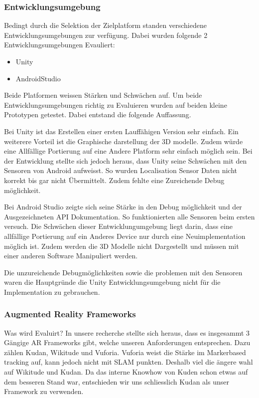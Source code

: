 \documentclass[a4paper]{scrreprt}
\begin{document}
\subsubsection{Entwicklungsumgebung}
Bedingt durch die Selektion der Zielplatform standen verschiedene Entwicklungsumgebungen zur verfügung. Dabei wurden folgende 2 Entwicklungsumgebungen Evauliert:
\begin{itemize}
\item Unity
\item AndroidStudio
\end{itemize}

Beide Platformen weissen Stärken und Schwächen auf. Um beide Entwicklungsumgebungen richtig zu Evaluieren wurden auf beiden kleine Prototypen getestet. Dabei entstand die folgende Auffassung.

Bei Unity ist das Erstellen einer ersten Lauffähigen Version sehr einfach. Ein weiterere Vorteil ist die Graphische darstellung der 3D modelle. Zudem würde eine Allfällige Portierung auf eine Andere Platform sehr einfach möglich sein. Bei der Entwicklung stellte sich jedoch heraus, dass Unity seine Schwächen mit den Sensoren von Android aufweisst. So wurden Localisation Sensor Daten nicht korrekt bis gar nicht Übermittelt. Zudem fehlte eine Zureichende Debug möglichkeit.

Bei Android Studio zeigte sich seine Stärke in den Debug möglichkeit und der Ausgezeichneten API Dokumentation. So funktionierten alle Sensoren beim ersten versuch. Die Schwächen dieser Entwicklungumgebung liegt darin, dass eine allfällige Portierung auf ein Anderes Device nur durch eine Neuimplementation möglich ist. Zudem werden die 3D Modelle nicht Dargestellt und müssen mit einer anderen Software Manipuliert werden.

Die unzureichende Debugmöglichkeiten sowie die problemen mit den Sensoren waren die Hauptgründe die Unity Entwicklungsumgebung nicht für die Implementation zu gebrauchen.

\subsubsection{Augmented Reality Frameworks}
Was wird Evaluirt?
In unsere recherche stellte sich heraus, dass es insgesammt 3 Gängige AR Frameworks gibt, welche unseren Anforderungen entsprechen.
Dazu zählen Kudan, Wikitude und Vuforia.
Vuforia weist die Stärke im Markerbased tracking auf, kann jedoch nicht mit SLAM punkten. Deshalb viel die ängere wahl auf Wikitude und Kudan. Da das interne Knowhow von Kuden schon etwas auf dem besseren Stand war, entschieden wir uns schliesslich Kudan als unser Framework zu verwenden.
\end{document}
